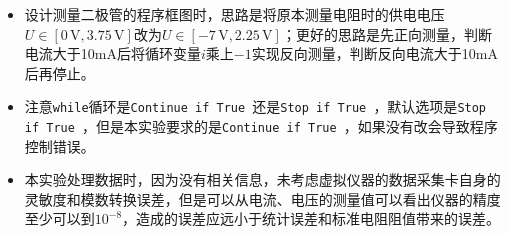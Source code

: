 \documentclass[a4paper,fontset=windows]{ctexart}
\begin{document}
    \begin{itemize}
        \item[1.] 设计测量二极管的程序框图时，思路是将原本测量电阻时的供电电压$U \in [0\,\mathrm{V}, 3.75\,\mathrm{V}]$改为$U \in [-7\,\mathrm{V}, 2.25\,\mathrm{V}]$；更好的思路是先正向测量，判断电流大于10mA后将循环变量$i$乘上$-1$实现反向测量，判断反向电流大于10mA后再停止。

        \item[2.] 注意\texttt{while}循环是\texttt{Continue if True }还是\texttt{Stop if True }，默认选项是\texttt{Stop if True }，但是本实验要求的是\texttt{Continue if True }，如果没有改会导致程序控制错误。

        \item[3.] 本实验处理数据时，因为没有相关信息，未考虑虚拟仪器的数据采集卡自身的灵敏度和模数转换误差，但是可以从电流、电压的测量值可以看出仪器的精度至少可以到$10^{-8}$，造成的误差应远小于统计误差和标准电阻阻值带来的误差。
    \end{itemize}
\end{document}
